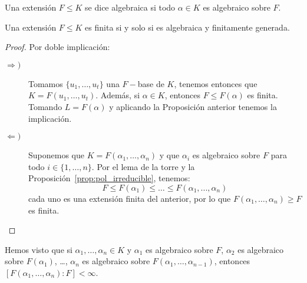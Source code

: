 \begin{definicion}
    Una extensión $F\leq K$ se dice algebraica si todo $\alpha\in K$ es algebraico sobre $F$.
\end{definicion}

\begin{teo}
    Una extensión $F\leq K$ es finita si y solo si es algebraica y finitamente generada.
    \begin{proof}
        Por doble implicación:
        \begin{description}
            \item [$\Longrightarrow )$] Tomamos $\{u_1, \ldots, u_t\}$ una $F-$base de $K$, tenemos entonces que $K = F(u_1, \ldots, u_t)$. Además, si $\alpha\in K$, entonces $F\leq F(\alpha)$ es finita. Tomando $L = F(\alpha)$ y aplicando la Proposición anterior tenemos la implicación.
            \item [$\Longleftarrow )$] Suponemos que $K = F(\alpha_1, \ldots, \alpha_n)$ y que $\alpha_i$ es algebraico sobre $F$ para todo $i\in \{1,\ldots,n\}$. Por el lema de la torre y la Proposición~\ref{prop:pol_irreducible}, tenemos:
                \begin{equation*}
                    F\leq F(\alpha_1) \leq \ldots \leq F(\alpha_1, ..., \alpha_n) 
                \end{equation*}
                cada uno es una extensión finita del anterior, por lo que $F(\alpha_1, \ldots, \alpha_n)\geq F$ es finita.
        \end{description}
    \end{proof}
\end{teo}

\begin{observacion}
    Hemos visto que si $\alpha_1, \ldots, \alpha_n\in K$ y $\alpha_1$ es algebraico sobre $F$, $\alpha_2 $ es algebraico sobre $F(\alpha_1)$, \ldots, $\alpha_n$ es algebraico sobre $F(\alpha_1, \ldots, \alpha_{n-1})$, entonces $[F(\alpha_1, \ldots, \alpha_n) : F] < \infty$.
\end{observacion}

